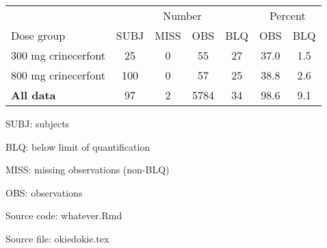 \setlength{\tabcolsep}{5pt}
\begin{threeparttable}
\renewcommand{\arraystretch}{1.3}
\begin{tabular}[h]{lcccccc}
\hline
\multicolumn{1}{c}{} & \multicolumn{4}{c}{Number} & \multicolumn{2}{c}{Percent} \\
\cmidrule(lr){2-5}
\cmidrule(lr){6-7}
Dose group & SUBJ & MISS & OBS & BLQ & OBS & BLQ \\
\hline
300 mg crinecerfont & 25 & 0 & 55 & 27 & 37.0 & 1.5 \\
800 mg crinecerfont & 100 & 0 & 57 & 25 & 38.8 & 2.6 \\
\hline \hline {\textbf{All data}} & 97 & 2 & 5784 & 34 & 98.6 & 9.1 \\
\hline
\end{tabular}
\begin{tablenotes}[flushleft]
\item SUBJ: subjects
\item BLQ: below limit of quantification
\item MISS: missing observations (non-BLQ)
\item OBS: observations
\item Source code: whatever.Rmd
\item Source file: okiedokie.tex
\end{tablenotes}
\end{threeparttable}